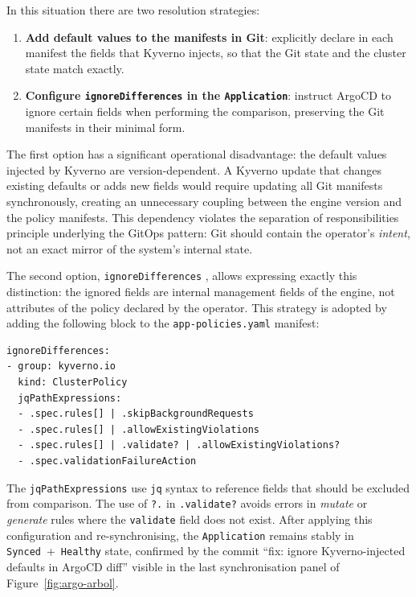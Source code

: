 In this situation there are two resolution strategies:

\begin{enumerate}
  \item \textbf{Add default values to the manifests in Git}: explicitly declare in each manifest the fields that Kyverno injects, so that the Git state and the cluster state match exactly.
  \item \textbf{Configure \texttt{ignoreDifferences} in the \texttt{Application}}: instruct ArgoCD to ignore certain fields when performing the comparison, preserving the Git manifests in their minimal form.
\end{enumerate}

The first option has a significant operational disadvantage: the default values injected by Kyverno are version-dependent. A Kyverno update that changes existing defaults or adds new fields would require updating all Git manifests synchronously, creating an unnecessary coupling between the engine version and the policy manifests. This dependency violates the separation of responsibilities principle underlying the GitOps pattern: Git should contain the operator's \textit{intent}, not an exact mirror of the system's internal state.

The second option, \texttt{ignoreDifferences} \cite{argocd_diffing}, allows expressing exactly this distinction: the ignored fields are internal management fields of the engine, not attributes of the policy declared by the operator. This strategy is adopted by adding the following block to the \texttt{app-policies.yaml} manifest:

\begin{lstlisting}
ignoreDifferences:
- group: kyverno.io
  kind: ClusterPolicy
  jqPathExpressions:
  - .spec.rules[] | .skipBackgroundRequests
  - .spec.rules[] | .allowExistingViolations
  - .spec.rules[] | .validate? | .allowExistingViolations?
  - .spec.validationFailureAction
\end{lstlisting}

The \texttt{jqPathExpressions} use \texttt{jq} syntax to reference fields that should be excluded from comparison. The use of \texttt{?.} in \texttt{.validate?} avoids errors in \textit{mutate} or \textit{generate} rules where the \texttt{validate} field does not exist. After applying this configuration and re-synchronising, the \texttt{Application} remains stably in \texttt{Synced}~+~\texttt{Healthy} state, confirmed by the commit ``fix: ignore Kyverno-injected defaults in ArgoCD diff'' visible in the last synchronisation panel of Figure~\ref{fig:argo-arbol}.

